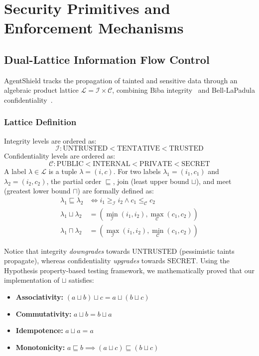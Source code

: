 \documentclass[conference]{IEEEtran}
\begin{document}
\section{Security Primitives and Enforcement Mechanisms}
\label{sec:mechanisms}

\subsection{Dual-Lattice Information Flow Control}
AgentShield tracks the propagation of tainted and sensitive data through an algebraic product lattice $\mathcal{L} = \mathcal{I} \times \mathcal{C}$, combining Biba integrity~\cite{biba1977integrity} and Bell-LaPadula confidentiality~\cite{bell1973secure}.

\subsubsection{Lattice Definition}
Integrity levels are ordered as:
\begin{equation}
\mathcal{I}: \text{UNTRUSTED} < \text{TENTATIVE} < \text{TRUSTED}
\end{equation}
Confidentiality levels are ordered as:
\begin{equation}
\mathcal{C}: \text{PUBLIC} < \text{INTERNAL} < \text{PRIVATE} < \text{SECRET}
\end{equation}
A label $\lambda \in \mathcal{L}$ is a tuple $\lambda = (i, c)$. For two labels $\lambda_1 = (i_1, c_1)$ and $\lambda_2 = (i_2, c_2)$, the partial order $\sqsubseteq$, join (least upper bound $\sqcup$), and meet (greatest lower bound $\sqcap$) are formally defined as:
\begin{align}
\lambda_1 \sqsubseteq \lambda_2 &\iff i_1 \ge_{\mathcal{I}} i_2 \land c_1 \le_{\mathcal{C}} c_2 \\
\lambda_1 \sqcup \lambda_2 &= (\min_{\mathcal{I}}(i_1, i_2), \max_{\mathcal{C}}(c_1, c_2)) \\
\lambda_1 \sqcap \lambda_2 &= (\max_{\mathcal{I}}(i_1, i_2), \min_{\mathcal{C}}(c_1, c_2))
\end{align}

Notice that integrity \textit{downgrades} towards $\text{UNTRUSTED}$ (pessimistic taints propagate), whereas confidentiality \textit{upgrades} towards $\text{SECRET}$. Using the Hypothesis property-based testing framework, we mathematically proved that our implementation of $\sqcup$ satisfies:
\begin{itemize}
    \item \textbf{Associativity:} $(a \sqcup b) \sqcup c = a \sqcup (b \sqcup c)$
    \item \textbf{Commutativity:} $a \sqcup b = b \sqcup a$
    \item \textbf{Idempotence:} $a \sqcup a = a$
    \item \textbf{Monotonicity:} $a \sqsubseteq b \implies (a \sqcup c) \sqsubseteq (b \sqcup c)$
\end{itemize}
\end{document}

